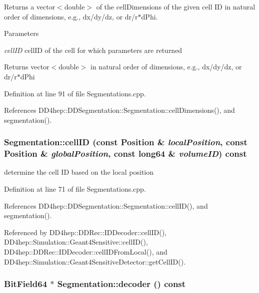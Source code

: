 Returns a vector$<$double$>$ of the cellDimensions of the given cell ID in natural order of dimensions, e.g., dx/dy/dz, or dr/r$\ast$dPhi. 
\begin{DoxyParams}{Parameters}
\item[{\em cellID}]cellID of the cell for which parameters are returned \end{DoxyParams}
\begin{DoxyReturn}{Returns}
vector$<$double$>$ in natural order of dimensions, e.g., dx/dy/dz, or dr/r$\ast$dPhi 
\end{DoxyReturn}


Definition at line 91 of file Segmentations.cpp.

References DD4hep::DDSegmentation::Segmentation::cellDimensions(), and segmentation().\hypertarget{class_d_d4hep_1_1_geometry_1_1_segmentation_abbcc6a9e5794b6e0e66001afd2ff8595}{
\subsubsection[{cellID}]{ Segmentation::cellID (const {\bf Position} \& {\em localPosition}, \/  const {\bf Position} \& {\em globalPosition}, \/  const {\bf long64} \& {\em volumeID}) const}}
\label{class_d_d4hep_1_1_geometry_1_1_segmentation_abbcc6a9e5794b6e0e66001afd2ff8595}


determine the cell ID based on the local position 

Definition at line 71 of file Segmentations.cpp.

References DD4hep::DDSegmentation::Segmentation::cellID(), and segmentation().

Referenced by DD4hep::DDRec::IDDecoder::cellID(), DD4hep::Simulation::Geant4Sensitive::cellID(), DD4hep::DDRec::IDDecoder::cellIDFromLocal(), and DD4hep::Simulation::Geant4SensitiveDetector::getCellID().\hypertarget{class_d_d4hep_1_1_geometry_1_1_segmentation_a298f8573f7781e5bf42aa37c12c2152b}{
\subsubsection[{decoder}]{\setlength{\rightskip}{0pt plus 5cm}BitField64 $\ast$ Segmentation::decoder () const}}
\label{class_d_d4hep_1_1_geometry_1_1_segmentation_a298f8573f7781e5bf42aa37c12c2152b}


